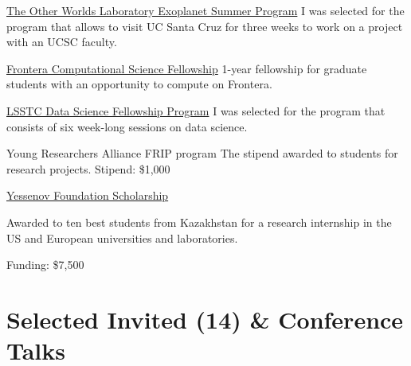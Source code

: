\documentclass[10pt]{article} %
\begin{document}
\begin{paracol}{1}
	{\href{https://owl.ucsc.edu/summer/}{The Other Worlds Laboratory Exoplanet Summer Program}} %
	{I was selected for the program that allows to visit UC Santa Cruz for three weeks to work on a project with an UCSC faculty.} %

	{\href{https://frontera-portal.tacc.utexas.edu/fellowship/}{Frontera Computational Science Fellowship}} %
	{1-year fellowship for graduate students with an opportunity to compute on Frontera.} %

	{\href{https://www.lsstcorporation.org/fellowship_program}{LSSTC Data Science Fellowship Program}} %
	{I was selected for the program that consists of six week-long sessions on data science.} %
	
	{Young Researchers Alliance FRIP program}
	{The stipend awarded to students for research projects. Stipend: \$1,000}
	
	
	\nonstopmode
	{\href{http://yessenovfoundation.org/en/}{Yessenov Foundation Scholarship}}
	{Awarded to ten best students from Kazakhstan for a research  internship in the US and European universities and laboratories. 
	
	Funding: \$7,500}
	
	



\section{Selected Invited (14) \& Conference Talks}





\end{paracol}
\end{document}

